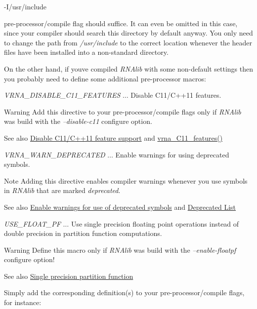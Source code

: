 \begin{DoxyVerb}-I/usr/include
\end{DoxyVerb}


pre-\/processor/compile flag should suffice. It can even be omitted in this case, since your compiler should search this directory by default anyway. You only need to change the path from {\itshape /usr/include} to the correct location whenever the header files have been installed into a non-\/standard directory.

On the other hand, if you\textquotesingle{}ve compiled {\itshape R\+N\+Alib} with some non-\/default settings then you probably need to define some additional pre-\/processor macros\+:


\begin{DoxyItemize}
\item {\itshape V\+R\+N\+A\+\_\+\+D\+I\+S\+A\+B\+L\+E\+\_\+\+C11\+\_\+\+F\+E\+A\+T\+U\+R\+ES} $\ldots$ Disable C11/\+C++11 features. \begin{DoxyWarning}{Warning}
Add this directive to your pre-\/processor/compile flags only if {\itshape R\+N\+Alib} was build with the {\itshape --disable-\/c11} configure option. 
\end{DoxyWarning}
\begin{DoxySeeAlso}{See also}
\hyperlink{install_config_c11}{Disable C11/\+C++11 feature support} and \hyperlink{group__data__structures_ga21744ae2d6a17309f9327d3547cef0cb}{vrna\+\_\+\+C11\+\_\+features()}
\end{DoxySeeAlso}

\item {\itshape V\+R\+N\+A\+\_\+\+W\+A\+R\+N\+\_\+\+D\+E\+P\+R\+E\+C\+A\+T\+ED} $\ldots$ Enable warnings for using deprecated symbols. \begin{DoxyNote}{Note}
Adding this directive enables compiler warnings whenever you use symbols in {\itshape R\+N\+Alib} that are marked {\itshape deprecated}. 
\end{DoxyNote}
\begin{DoxySeeAlso}{See also}
\hyperlink{install_config_deprecated}{Enable warnings for use of deprecated symbols} and \hyperlink{deprecated}{Deprecated List}
\end{DoxySeeAlso}

\item {\itshape U\+S\+E\+\_\+\+F\+L\+O\+A\+T\+\_\+\+PF} $\ldots$ Use single precision floating point operations instead of double precision in partition function computations. \begin{DoxyWarning}{Warning}
Define this macro only if {\itshape R\+N\+Alib} was build with the {\itshape --enable-\/floatpf} configure option! 
\end{DoxyWarning}
\begin{DoxySeeAlso}{See also}
\hyperlink{install_config_float_pf}{Single precision partition function}
\end{DoxySeeAlso}

\end{DoxyItemize}Simply add the corresponding definition(s) to your pre-\/processor/compile flags, for instance\+:

